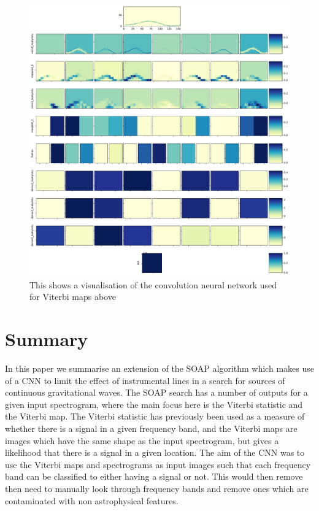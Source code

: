 \begin{figure}[h]
	\centering
	\includegraphics[width=\textwidth]{C4_cnn/vitmap_cnn_visualisation_signal.pdf}
	\caption{This shows a visualisation of the convolution neural network used for Viterbi maps above}
	\label{cnn:vis:vitmap:signal}
\end{figure}


\section{Summary}

In this paper we summarise an extension of the SOAP algorithm which makes use of a \ac{CNN} to limit the effect of instrumental lines in a search for sources of continuous gravitational waves.
The SOAP search has a number of outputs for a given input spectrogram, where the main focus here is the Viterbi statistic and the Viterbi map. 
The Viterbi statistic has previously been used as a measure of whether there is a signal in a given frequency band, and the Viterbi maps are images which have the same shape as the input spectrogram, but gives a likelihood that there is a signal in a given location. 
The aim of the \ac{CNN} was to use the Viterbi maps and spectrograms as input images such that each frequency band can be classified to either having a signal or not. 
This would then remove then need to manually look through frequency bands and remove ones which are contaminated with non astrophysical features. 


